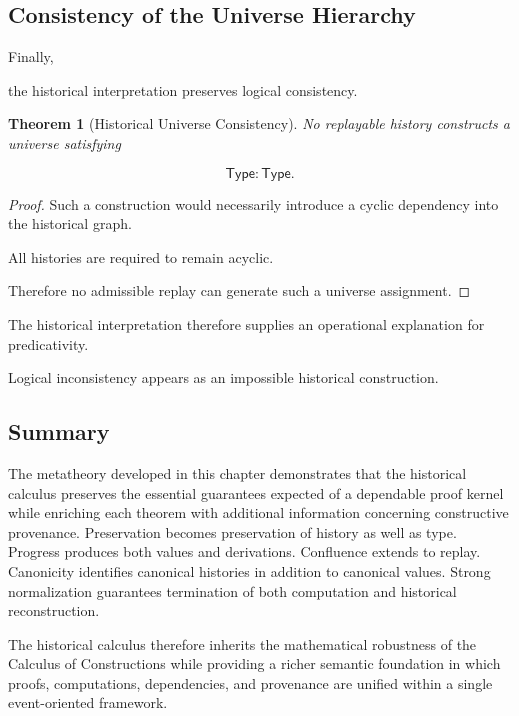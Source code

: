 \documentclass[12pt,oneside]{article}
\newtheorem{theorem}{Theorem}[section]
\theoremstyle{definition}
\theoremstyle{remark}
\newcommand{\Type}{\mathsf{Type}}
\begin{document}
\subsection{Consistency of the Universe Hierarchy}

Finally,

the historical interpretation preserves logical consistency.

\begin{theorem}[Historical Universe Consistency]

No replayable history constructs a universe satisfying

\[
\Type
:
\Type.
\]

\end{theorem}

\begin{proof}

Such a construction would necessarily introduce a cyclic dependency into the
historical graph.

All histories are required to remain acyclic.

Therefore no admissible replay can generate such a universe assignment.

\end{proof}

The historical interpretation therefore supplies an operational explanation for
predicativity.

Logical inconsistency appears as an impossible historical construction.

\subsection{Summary}

The metatheory developed in this chapter demonstrates that the historical
calculus preserves the essential guarantees expected of a dependable proof
kernel while enriching each theorem with additional information concerning
constructive provenance. Preservation becomes preservation of history as well as
type. Progress produces both values and derivations. Confluence extends to
replay. Canonicity identifies canonical histories in addition to canonical
values. Strong normalization guarantees termination of both computation and
historical reconstruction.

The historical calculus therefore inherits the mathematical robustness of the
Calculus of Constructions while providing a richer semantic foundation in which
proofs, computations, dependencies, and provenance are unified within a single
event-oriented framework.
\end{document}
